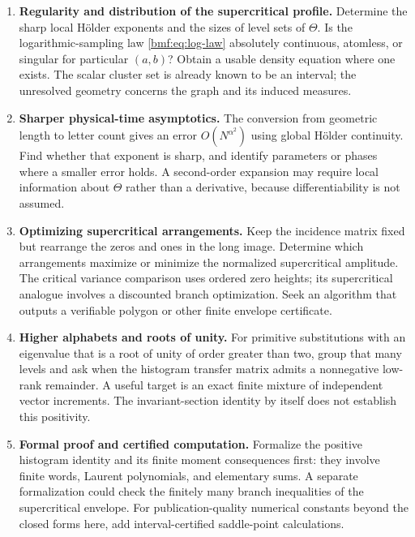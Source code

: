 \documentclass[11pt]{article}
\numberwithin{equation}{section}
\theoremstyle{definition}
\theoremstyle{remark}
\begin{document}
\begin{enumerate}[leftmargin=*,itemsep=7pt]
\item \textbf{Regularity and distribution of the supercritical profile.}
Determine the sharp local H\"older exponents and the sizes of
level sets of $\Theta$. Is the logarithmic-sampling law
\eqref{bmf:eq:log-law} absolutely continuous, atomless, or singular
for particular $(a,b)$? Obtain a usable density equation where
one exists. The scalar cluster set is already known to be an
interval; the unresolved geometry concerns the graph and
its induced measures.

\item \textbf{Sharper physical-time asymptotics.}
The conversion from geometric length to letter count gives an
error $O(N^{\alpha^2})$ using global H\"older continuity.
Find whether that exponent is sharp, and identify parameters
or phases where a smaller error holds. A second-order
expansion may require local information about $\Theta$ rather
than a derivative, because differentiability is not assumed.

\item \textbf{Optimizing supercritical arrangements.}
Keep the incidence matrix fixed but rearrange the zeros and
ones in the long image. Determine which arrangements maximize
or minimize the normalized supercritical amplitude. The
critical variance comparison uses ordered zero heights;
its supercritical analogue involves a discounted branch
optimization. Seek an algorithm that outputs a verifiable
polygon or other finite envelope certificate.

\item \textbf{Higher alphabets and roots of unity.}
For primitive substitutions with an eigenvalue that is a
root of unity of order greater than two, group that many
levels and ask when the histogram transfer matrix admits a
nonnegative low-rank remainder. A useful target is an exact
finite mixture of independent vector increments. The
invariant-section identity by itself does not establish
this positivity.

\item \textbf{Formal proof and certified computation.}
Formalize the positive histogram identity and its finite
moment consequences first: they involve finite words,
Laurent polynomials, and elementary sums. A separate
formalization could check the finitely many branch inequalities
of the supercritical envelope. For publication-quality
numerical constants beyond the closed forms here, add
interval-certified saddle-point calculations.


\end{enumerate}
\end{document}
